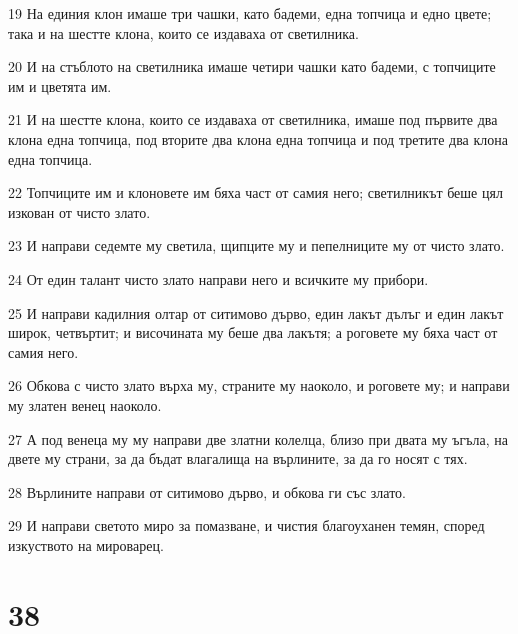 \par 19 На единия клон имаше три чашки, като бадеми, една топчица и едно цвете; така и на шестте клона, които се издаваха от светилника.
\par 20 И на стъблото на светилника имаше четири чашки като бадеми, с топчиците им и цветята им.
\par 21 И на шестте клона, които се издаваха от светилника, имаше под първите два клона една топчица, под вторите два клона една топчица и под третите два клона една топчица.
\par 22 Топчиците им и клоновете им бяха част от самия него; светилникът беше цял изкован от чисто злато.
\par 23 И направи седемте му светила, щипците му и пепелниците му от чисто злато.
\par 24 От един талант чисто злато направи него и всичките му прибори.
\par 25 И направи кадилния олтар от ситимово дърво, един лакът дълъг и един лакът широк, четвъртит; и височината му беше два лакътя; а роговете му бяха част от самия него.
\par 26 Обкова с чисто злато върха му, страните му наоколо, и роговете му; и направи му златен венец наоколо.
\par 27 А под венеца му му направи две златни колелца, близо при двата му ъгъла, на двете му страни, за да бъдат влагалища на върлините, за да го носят с тях.
\par 28 Върлините направи от ситимово дърво, и обкова ги със злато.
\par 29 И направи светото миро за помазване, и чистия благоуханен темян, според изкуството на мироварец.

\chapter{38}

